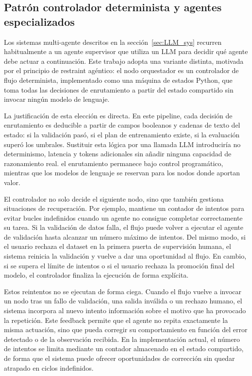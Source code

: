 \documentclass[12pt,a4paper]{article}
\theoremstyle{plain}
\begin{document}
\subsection{Patrón controlador determinista y agentes especializados}
\label{sec:controlador-determinista}

Los sistemas multi-agente descritos en la sección~\ref{sec:LLM_sys} recurren habitualmente a un agente supervisor que utiliza un LLM para decidir qué agente debe actuar a continuación. Este trabajo adopta una variante distinta, motivada por el principio de restraint agéntico: el nodo orquestador es un controlador de flujo determinista, implementado como una máquina de estados Python, que toma todas las decisiones de enrutamiento a partir del estado compartido sin invocar ningún modelo de lenguaje.

La justificación de esta elección es directa. En este pipeline, cada decisión de enrutamiento es deducible a partir de campos booleanos y cadenas de texto del estado: si la validación pasó, si el plan de entrenamiento existe, si la evaluación superó los umbrales. Sustituir esta lógica por una llamada LLM introduciría no determinismo, latencia y tokens adicionales sin añadir ninguna capacidad de razonamiento real. el enrutamiento permanece bajo control programático, mientras que los modelos de lenguaje se reservan para los nodos donde aportan valor.

El controlador no solo decide el siguiente nodo, sino que también gestiona situaciones de recuperación. Por ejemplo, mantiene un contador de intentos para evitar bucles indefinidos cuando un agente no consigue completar correctamente su tarea. Si la validación de datos falla, el flujo puede volver a ejecutar el agente de validación hasta alcanzar un número máximo de intentos. Del mismo modo, si el usuario rechaza el dataset en la primera puerta de supervisión humana, el sistema reinicia la validación y vuelve a dar una oportunidad al flujo. En cambio, si se supera el límite de intentos o si el usuario rechaza la promoción final del modelo, el controlador finaliza la ejecución de forma explícita.

Estos reintentos no se ejecutan de forma ciega. Cuando el flujo vuelve a invocar un nodo tras un fallo de validación, una salida inválida o un rechazo humano, el sistema incorpora al nuevo intento información sobre el motivo que ha provocado la repetición. Este feedback permite que el agente no repita exactamente la misma actuación, sino que pueda corregir su comportamiento en función del error detectado o de la observación recibida. En la implementación actual, el número de intentos se limita mediante un contador almacenado en el estado compartido, de forma que el sistema puede ofrecer oportunidades de corrección sin quedar atrapado en ciclos indefinidos.
\end{document}
